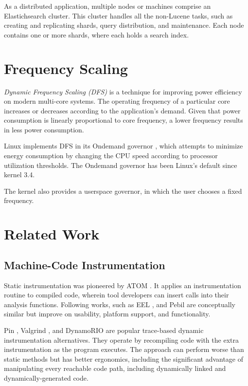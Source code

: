 As a distributed application, multiple nodes or machines comprise an Elastichsearch cluster. This cluster handles all the non-Lucene tasks, such as creating and replicating shards, query distribution, and maintenance. Each node contains one or more shards, where each holds a search index.

\section{Frequency Scaling}

\emph{Dynamic Frequency Scaling (DFS)} is a technique for improving power efficiency on modern multi-core systems. The operating frequency of a particular core increases or decreases according to the application's demand. Given that power consumption is linearly proportional to core frequency, a lower frequency results in less power consumption.

Linux implements DFS in its Ondemand governor \cite{pallipadi2006ondemand}, which attempts to minimize energy consumption by changing the CPU speed according to processor utilization thresholds. The Ondemand governor has been Linux's default since kernel 3.4.

The kernel also provides a userspace governor, in which the user chooses a fixed frequency. 

\section{Related Work}

\nocite{kell2012observable}

\subsection{Machine-Code Instrumentation}

Static instrumentation was pioneered by ATOM \cite{srivastava1994atom}. It applies an instrumentation routine to compiled code, wherein tool developers can insert calls into their analysis functions. Following works, such as EEL \cite{larus1995eel}, and Pebil \cite{laurenzano2010pebil} are conceptually similar but improve on usability, platform support, and functionality.

Pin \cite{luk2005pin}, Valgrind \cite{nethercote2007valgrind}, and DynamoRIO \cite{bruening2004dynamorio} are popular trace-based dynamic instrumentation alternatives. They operate by recompiling code with the extra instrumentation as the program executes. The approach can perform worse than static methods but has better ergonomics, including the significant advantage of manipulating every reachable code path, including dynamically linked and dynamically-generated code.

